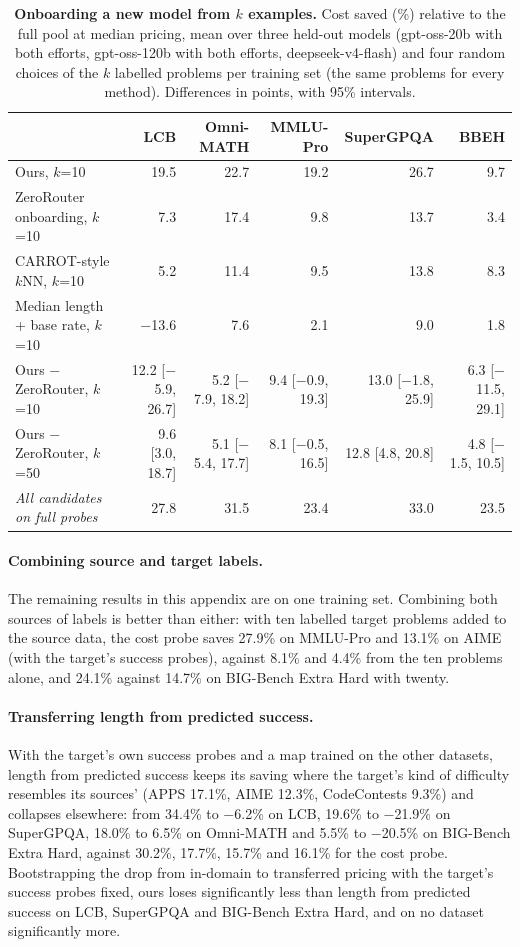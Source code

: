 \documentclass[10pt]{article}
\begin{document}
\begin{table}[h]
\centering
\footnotesize
\setlength{\tabcolsep}{4pt}
\begin{tabular}{lrrrrr}
\toprule
 & LCB & Omni-MATH & MMLU-Pro & SuperGPQA & BBEH \\
\midrule
Ours, $k$=10 & 19.5 & 22.7 & 19.2 & 26.7 & 9.7 \\
ZeroRouter onboarding, $k$=10 & 7.3 & 17.4 & 9.8 & 13.7 & 3.4 \\
CARROT-style $k$NN, $k$=10 & 5.2 & 11.4 & 9.5 & 13.8 & 8.3 \\
Median length + base rate, $k$=10 & $-$13.6 & 7.6 & 2.1 & 9.0 & 1.8 \\
\midrule
Ours $-$ ZeroRouter, $k$=10 & 12.2 [$-$5.9, 26.7] & 5.2 [$-$7.9, 18.2] & 9.4 [$-$0.9, 19.3] & 13.0 [$-$1.8, 25.9] & 6.3 [$-$11.5, 29.1] \\
Ours $-$ ZeroRouter, $k$=50 & 9.6 [3.0, 18.7] & 5.1 [$-$5.4, 17.7] & 8.1 [$-$0.5, 16.5] & 12.8 [4.8, 20.8] & 4.8 [$-$1.5, 10.5] \\
\midrule
\emph{All candidates on full probes} & 27.8 & 31.5 & 23.4 & 33.0 & 23.5 \\
\bottomrule
\end{tabular}
\caption{\textbf{Onboarding a new model from $k$ examples.} Cost saved (\%) relative to the full pool at median pricing, mean over three held-out models (gpt-oss-20b with both efforts, gpt-oss-120b with both efforts, deepseek-v4-flash) and four random choices of the $k$ labelled problems per training set (the same problems for every method). Differences in points, with 95\% intervals.}
\label{tab:onboard}
\end{table}
\paragraph{Combining source and target labels.} The remaining results in this appendix are on one training set. Combining both sources of labels is better than either: with ten labelled target problems added to the source data, the cost probe saves 27.9\% on MMLU-Pro and 13.1\% on AIME (with the target's success probes), against 8.1\% and 4.4\% from the ten problems alone, and 24.1\% against 14.7\% on BIG-Bench Extra Hard with twenty. 
\paragraph{Transferring length from predicted success.} With the target's own success probes and a map trained on the other datasets, length from predicted success keeps its saving where the target's kind of difficulty resembles its sources' (APPS 17.1\%, AIME 12.3\%, CodeContests 9.3\%) and collapses elsewhere: from 34.4\% to $-$6.2\% on LCB, 19.6\% to $-$21.9\% on SuperGPQA, 18.0\% to 6.5\% on Omni-MATH and 5.5\% to $-$20.5\% on BIG-Bench Extra Hard, against 30.2\%, 17.7\%, 15.7\% and 16.1\% for the cost probe. Bootstrapping the drop from in-domain to transferred pricing with the target's success probes fixed, ours loses significantly less than length from predicted success on LCB, SuperGPQA and BIG-Bench Extra Hard, and on no dataset significantly more.
\end{document}
